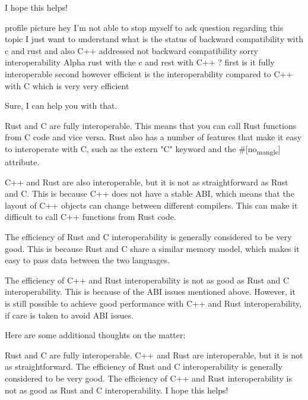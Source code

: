 \documentclass[11pt]{article}
\begin{document}
I hope this helps!

profile picture
hey I'm not able to stop myself to ask
question regarding this topic I just want to understand what is the status of backward compatibility with c
and rust
and also C++ addressed
not backward compatibility sorry interoperability
Alpha
rust with the c and rest with C++
?
first is it fully interoperable
second however efficient is the interoperability
compared to
C++ with C which is
very very efficient

Sure, I can help you with that.

Rust and C are fully interoperable. This means that you can call Rust functions from C code and vice versa. Rust also has a number of features that make it easy to interoperate with C, such as the extern "C" keyword and the \#[no\textsubscript{mangle}] attribute.

C++ and Rust are also interoperable, but it is not as straightforward as Rust and C. This is because C++ does not have a stable ABI, which means that the layout of C++ objects can change between different compilers. This can make it difficult to call C++ functions from Rust code.

The efficiency of Rust and C interoperability is generally considered to be very good. This is because Rust and C share a similar memory model, which makes it easy to pass data between the two languages.

The efficiency of C++ and Rust interoperability is not as good as Rust and C interoperability. This is because of the ABI issues mentioned above. However, it is still possible to achieve good performance with C++ and Rust interoperability, if care is taken to avoid ABI issues.

Here are some additional thoughts on the matter:

Rust and C are fully interoperable.
C++ and Rust are interoperable, but it is not as straightforward.
The efficiency of Rust and C interoperability is generally considered to be very good.
The efficiency of C++ and Rust interoperability is not as good as Rust and C interoperability.
I hope this helps!
\end{document}
